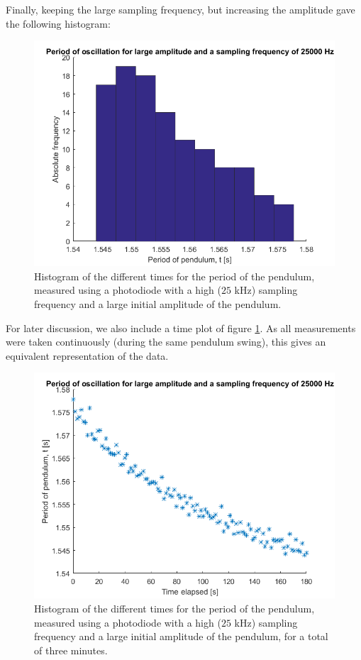 \documentclass[a4paper, 10pt]{article}
\begin{document}
Finally, keeping the large sampling frequency, but increasing the amplitude gave the following histogram:\\
\begin{figure}[ht!]
\centering
\includegraphics[scale=0.6]{Experiment2_3_large_high.png}
\caption{Histogram of the different times for the period of the pendulum, measured using a photodiode with a high ($25$ kHz) sampling frequency and a large initial amplitude of the pendulum.}\label{fig:Experiment_2_3_large_high}
\end{figure}
\newpage
For later discussion, we also include a time plot of figure \ref{fig:Experiment_2_3_large_high}. As all measurements were taken continuously (during the same pendulum swing), this gives an equivalent representation of the data.\\
\begin{figure}[ht!]
\centering
\includegraphics[scale=0.7]{Experiment2_3_large_high_time.png}
\caption{Histogram of the different times for the period of the pendulum, measured using a photodiode with a high ($25$ kHz) sampling frequency and a large initial amplitude of the pendulum, for a total of three minutes.}\label{fig:Experiment_2_3_large_high_time}
\end{figure}
\end{document}
